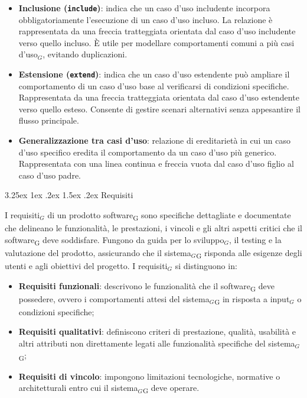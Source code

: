 \documentclass[a4paper, 10pt]{article}
\makeatletter
\renewcommand\paragraph{\@startsection{paragraph}{4}{\z@}%
  {3.25ex \@plus1ex \@minus .2ex}%
  {1.5ex \@plus .2ex}%
  {\normalfont\normalsize\bfseries}}
\makeatother
\begin{document}
\begin{itemize}
    \item \textbf{Inclusione (\texttt{\guillemotleft include\guillemotright})}: indica che un caso d'uso includente incorpora obbligatoriamente l'esecuzione di un caso d'uso incluso. La relazione è rappresentata da una freccia tratteggiata orientata dal caso d'uso includente verso quello incluso. È utile per modellare comportamenti comuni a più casi d'uso$_G$, evitando duplicazioni.
    \item \textbf{Estensione (\texttt{\guillemotleft extend\guillemotright})}: indica che un caso d'uso estendente può ampliare il comportamento di un caso d'uso base al verificarsi di condizioni specifiche. Rappresentata da una freccia tratteggiata orientata dal caso d'uso estendente verso quello esteso. Consente di gestire scenari alternativi senza appesantire il flusso principale.
    \item \textbf{Generalizzazione tra casi d'uso}: relazione di ereditarietà in cui un caso d'uso specifico eredita il comportamento da un caso d'uso più generico. Rappresentata con una linea continua e freccia vuota dal caso d'uso figlio al caso d'uso padre.
\end{itemize}

\paragraph{Requisiti}\label{attivita-requisiti}

I requisiti$_G$ di un prodotto software\textsubscript{G} sono specifiche dettagliate e documentate che delineano le funzionalità, le prestazioni, i vincoli e gli altri aspetti critici che il software\textsubscript{G} deve soddisfare. Fungono da guida per lo sviluppo$_G$, il testing e la valutazione del prodotto, assicurando che il sistema$_G$\textsubscript{G} risponda alle esigenze degli utenti e agli obiettivi del progetto. I requisiti$_G$ si distinguono in:

\begin{itemize}
    \item \textbf{Requisiti funzionali}: descrivono le funzionalità che il software\textsubscript{G} deve possedere, ovvero i comportamenti attesi del sistema$_G$\textsubscript{G} in risposta a input$_G$ o condizioni specifiche;
    \item \textbf{Requisiti qualitativi}: definiscono criteri di prestazione, qualità, usabilità e altri attributi non direttamente legati alle funzionalità specifiche del sistema$_G$\textsubscript{G};
    \item \textbf{Requisiti di vincolo}: impongono limitazioni tecnologiche, normative o architetturali entro cui il sistema$_G$\textsubscript{G} deve operare.
\end{itemize}
\end{document}
